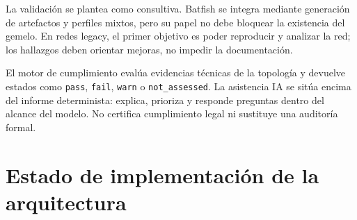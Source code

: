 La validación se plantea como consultiva. Batfish se integra mediante generación de artefactos y perfiles mixtos, pero su papel no debe bloquear la existencia del gemelo. En redes legacy, el primer objetivo es poder reproducir y analizar la red; los hallazgos deben orientar mejoras, no impedir la documentación.

El motor de cumplimiento evalúa evidencias técnicas de la topología y devuelve estados como \texttt{pass}, \texttt{fail}, \texttt{warn} o \texttt{not\_assessed}. La asistencia IA se sitúa encima del informe determinista: explica, prioriza y responde preguntas dentro del alcance del modelo. No certifica cumplimiento legal ni sustituye una auditoría formal.

\section{Estado de implementación de la arquitectura} \label{sec:estado-implementacion-arquitectura}

